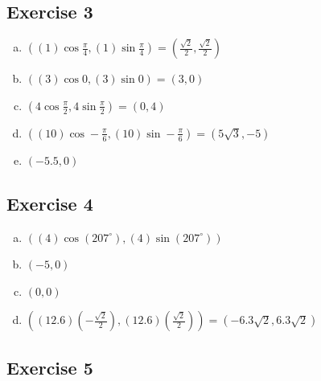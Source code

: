 \documentclass[11pt]{article}
\begin{document}
\subsection{Exercise 3}

\begin{enumerate}[a.]
	\item $((1)\cos\frac{\pi}{4},(1)\sin\frac{\pi}{4})=(\frac{\sqrt{2}}{2},\frac{\sqrt{2}}{2})$
	\item $((3)\cos0,(3)\sin0)=(3,0)$
	\item $(4\cos\frac{\pi}{2},4\sin\frac{\pi}{2})=(0,4)$
	\item $((10)\cos-\frac{\pi}{6},(10)\sin-\frac{\pi}{6})=(5\sqrt{3},-5)$
	\item $(-5.5,0)$
\end{enumerate}


\subsection{Exercise 4}

\begin{enumerate}[a.]
	\item $((4)\cos(207^\circ),(4)\sin(207^\circ))$
	\item $(-5,0)$
	\item $(0,0)$
	\item $((12.6)(-\frac{\sqrt{2}}{2}),(12.6)(\frac{\sqrt{2}}{2}))=(-6.3\sqrt{2},6.3\sqrt{2})$
\end{enumerate}


\subsection{Exercise 5}
\end{document}
